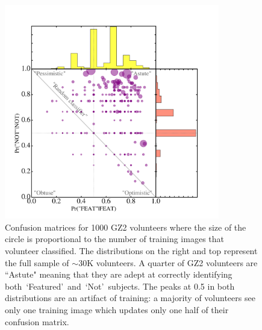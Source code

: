 \documentclass[twocolumn]{aastex6}
\newcommand{\feat}{`Featured'}
\newcommand{\notfeat}{`Not'}
\begin{document}
\begin{figure}[t!]
\includegraphics[width=3.7in]{figures/test_user_probs.png}
\caption{Confusion matrices for 1000 GZ2 volunteers where the size of the circle is proportional to the number of training images that volunteer classified. The distributions on the right and top represent the full sample of $\sim$30K volunteers. A quarter of GZ2 volunteers are ``Astute" meaning that they are adept at correctly identifying both~\feat~and~\notfeat~subjects. The peaks at 0.5 in both distributions are an artifact of training: a majority of volunteers see only one training image which updates only one half of their confusion matrix. \label{fig: volunteer training}}
\end{figure}

\end{document}
